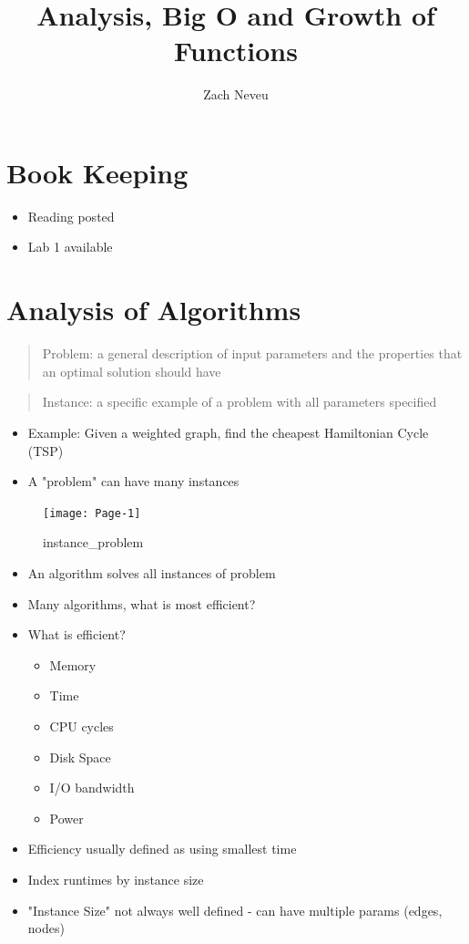 \documentclass[12pt, letter]{article}
\author{Zach Neveu}
\title{ Analysis, Big O and Growth of Functions }
\begin{document}
\maketitle

\section{Book Keeping}%
\label{sec:book_keeping}
\begin{itemize}
	\item Reading posted
	\item Lab 1 available
\end{itemize}

\section{Analysis of Algorithms}%
\label{sec:analysis_of_algorithms}
\begin{quote}
	Problem: a general description of input parameters and the properties that an optimal solution should have
\end{quote}
\begin{quote}
	Instance: a specific example of a problem with all parameters specified
\end{quote}
\begin{itemize}
	\item Example: Given a weighted graph, find the cheapest Hamiltonian Cycle (TSP)
	\item A "problem" can have many instances
\end{itemize}

\begin{figure}[h]
	\centering
	\texttt{[image: Page-1]}
	\caption{instance\_problem}
	\label{fig:instance_problem}
\end{figure}

\begin{itemize}
	\item An algorithm solves all instances of problem
	\item Many algorithms, what is most efficient?
	\item What is efficient?
	\begin{itemize}
		\item Memory
		\item Time
		\item CPU cycles
		\item Disk Space
		\item I/O bandwidth
		\item Power
	\end{itemize}
	\item Efficiency usually defined as using smallest time
	\item Index runtimes by instance size
	\item "Instance Size" not always well defined - can have multiple params (edges, nodes)
\end{itemize}
\end{document}

